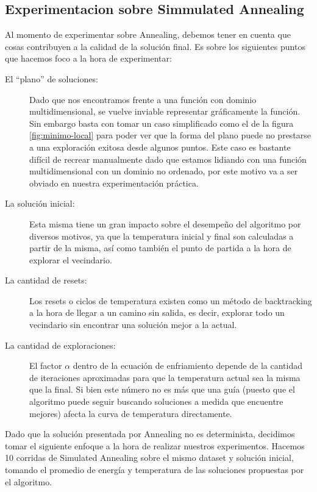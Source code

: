 \subsection{Experimentacion sobre Simmulated Annealing}

Al momento de experimentar sobre Annealing, debemos tener en cuenta que cosas contribuyen a la calidad de la solución final. Es sobre los siguientes puntos que hacemos foco a la hora de experimentar:

\begin{description}
\item[El “plano” de soluciones:] Dado que nos encontramos frente a una función con dominio multidimensional, se vuelve inviable representar gráficamente la función. Sin embargo basta con tomar un caso simplificado como el de la figura \ref{fig:minimo-local} para poder ver que la forma del plano puede no prestarse a una exploración exitosa desde algunos puntos. Este caso es bastante difícil de recrear manualmente dado que estamos lidiando con una función multidimensional con un dominio no ordenado, por este motivo va a ser obviado en nuestra experimentación práctica.

\item[La solución inicial:] Esta misma tiene un gran impacto sobre el desempeño del algoritmo por diversos motivos, ya que la temperatura inicial y final son calculadas a partir de la misma, así como también el punto de partida a la hora de explorar el vecindario. 

\item[La cantidad de resets:] Los resets o ciclos de temperatura existen como un método de backtracking a la hora de llegar a un camino sin salida, es decir, explorar todo un vecindario sin encontrar una solución mejor a la actual.

\item[La cantidad de exploraciones:] El factor $\alpha$ dentro de la ecuación de enfriamiento depende de la cantidad de iteraciones aproximadas para que la temperatura actual sea la misma que la final. Si bien este número no es más que una guía (puesto que el algoritmo puede seguir buscando soluciones a medida que encuentre mejores) afecta la curva de temperatura directamente. 

\end{description}


Dado que la solución presentada por Annealing no es determinista, decidimos tomar el siguiente enfoque a la hora de realizar nuestros experimentos.
Hacemos 10 corridas de Simulated Annealing sobre el mismo dataset y solución inicial, tomando el promedio de energía y temperatura de las soluciones propuestas por el algoritmo.

